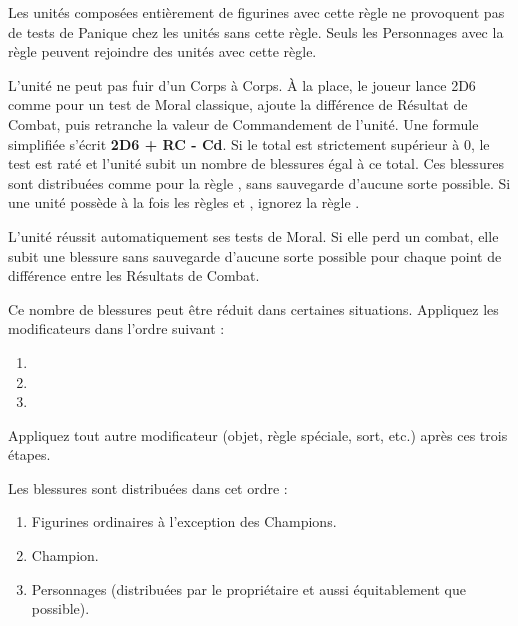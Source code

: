 
Les unités composées entièrement de figurines avec cette règle ne provoquent pas de tests de Panique chez les unités sans cette règle. Seuls les Personnages avec la règle \insignificant{} peuvent rejoindre des unités avec cette règle.


L'unité ne peut pas fuir d'un Corps à Corps. À la place, le joueur lance 2D6 comme pour un test de Moral classique, ajoute la différence de Résultat de Combat, puis retranche la valeur de Commandement de l'unité. Une formule simplifiée s'écrit \textbf{2D6 + RC - Cd}. Si le total est strictement supérieur à 0, le test est raté et l'unité subit un nombre de blessures égal à ce total. Ces blessures sont distribuées comme pour la règle \unstable{}, sans sauvegarde d'aucune sorte possible. Si une unité possède à la fois les règles \daemonicinstability{} et \unstable{}, ignorez la règle \unstable{}.

\newpage
{}

L'unité réussit automatiquement ses tests de Moral. Si elle perd un combat, elle subit une blessure sans sauvegarde d'aucune sorte possible pour chaque point de différence entre les Résultats de Combat.

Ce nombre de blessures peut être réduit dans certaines situations. Appliquez les modificateurs dans l'ordre suivant :
\begin{enumerate}
\item {}
\item {}
\item {}
\end{enumerate}
Appliquez tout autre modificateur (objet, règle spéciale, sort, etc.) après ces trois étapes.

Les blessures sont distribuées dans cet ordre :
\begin{enumerate}
\item Figurines ordinaires à l'exception des Champions.
\item Champion.
\item Personnages (distribuées par le propriétaire et aussi équitablement que possible).
\end{enumerate}

